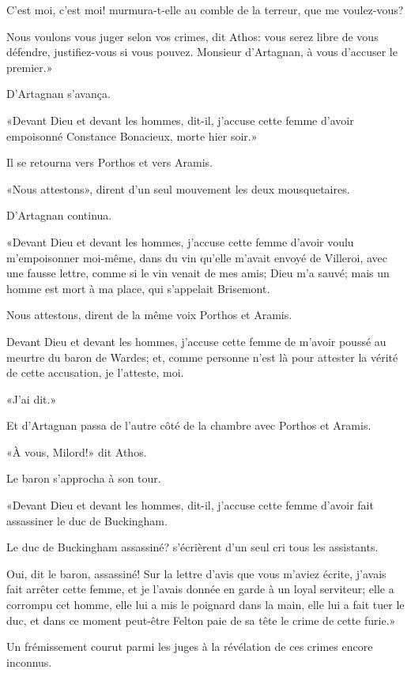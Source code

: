 \speak  C'est moi, c'est moi! murmura-t-elle au comble de la terreur, que me voulez-vous? 

\speak  Nous voulons vous juger selon vos crimes, dit Athos: vous serez libre de vous défendre, justifiez-vous si vous pouvez. Monsieur d'Artagnan, à vous d'accuser le premier.» 

D'Artagnan s'avança. 

«Devant Dieu et devant les hommes, dit-il, j'accuse cette femme d'avoir empoisonné Constance Bonacieux, morte hier soir.» 

Il se retourna vers Porthos et vers Aramis. 

«Nous attestons», dirent d'un seul mouvement les deux mousquetaires. 

D'Artagnan continua. 

«Devant Dieu et devant les hommes, j'accuse cette femme d'avoir voulu m'empoisonner moi-même, dans du vin qu'elle m'avait envoyé de Villeroi, avec une fausse lettre, comme si le vin venait de mes amis; Dieu m'a sauvé; mais un homme est mort à ma place, qui s'appelait Brisemont. 

\speak  Nous attestons, dirent de la même voix Porthos et Aramis. 

\speak  Devant Dieu et devant les hommes, j'accuse cette femme de m'avoir poussé au meurtre du baron de Wardes; et, comme personne n'est là pour attester la vérité de cette accusation, je l'atteste, moi. 

«J'ai dit.» 

Et d'Artagnan passa de l'autre côté de la chambre avec Porthos et Aramis. 

«À vous, Milord!» dit Athos. 

Le baron s'approcha à son tour. 

«Devant Dieu et devant les hommes, dit-il, j'accuse cette femme d'avoir fait assassiner le duc de Buckingham. 

\speak  Le duc de Buckingham assassiné? s'écrièrent d'un seul cri tous les assistants. 

\speak  Oui, dit le baron, assassiné! Sur la lettre d'avis que vous m'aviez écrite, j'avais fait arrêter cette femme, et je l'avais donnée en garde à un loyal serviteur; elle a corrompu cet homme, elle lui a mis le poignard dans la main, elle lui a fait tuer le duc, et dans ce moment peut-être Felton paie de sa tête le crime de cette furie.» 

Un frémissement courut parmi les juges à la révélation de ces crimes encore inconnus. 

